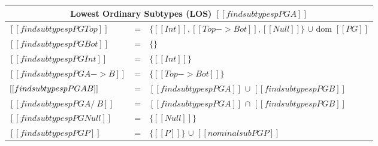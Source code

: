 \begin{figure}[t]

\begin{center}
    {\renewcommand{\arraystretch}{1.2}
    \begin{tabular}{|lcl|}
     \multicolumn{3}{c}{Lowest Ordinary Subtypes (LOS) $[[findsubtypesp PG A]]$} \\
     \hline
     $[[findsubtypesp PG Top]]$ & = & $\{ [[Int]], [[Top -> Bot]], [[Null]]\}$ $\cup$ dom $[[PG]]$  \\
     $[[findsubtypesp PG Bot]]$ & = & $\{\}$  \\
     $[[findsubtypesp PG Int]]$ & = & $\{[[Int]]\}$  \\
     $[[findsubtypesp PG A -> B]]$ & = & $\{[[Top -> Bot]]\}$  \\
     $[[findsubtypesp PG A \/ B]]$ & = & $[[findsubtypesp PG A]]$ $\cup$ $[[findsubtypesp PG B]]$  \\
     $[[findsubtypesp PG A /\ B]]$ & = & $[[findsubtypesp PG A]]$ $\cap$ $[[findsubtypesp PG B]]$  \\
     $[[findsubtypesp PG Null]]$ & = & $\{ [[Null]]\}$  \\
     $[[findsubtypesp PG P]]$ & = & $\{[[P]]\}$ $\cup$ $[[nominalsub PG P]]$\\
     \hline
    \end{tabular} }


\end{center}
\end{figure}
